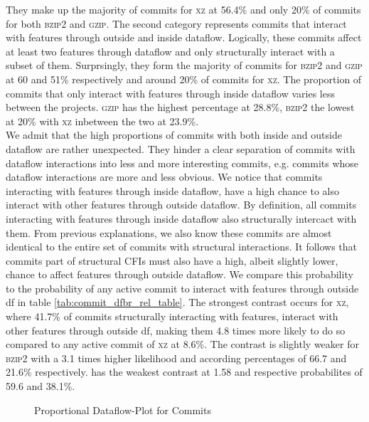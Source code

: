 They make up the majority of commits for \textsc{xz} at 56.4\% and only 20\% of commits for both \textsc{bzip2} and \textsc{gzip}.
The second category represents commits that interact with features through outside and inside dataflow.
Logically, these commits affect at least two features through dataflow and only structurally interact with a subset of them.
Surprsingly, they form the majority of commits for \textsc{bzip2} and \textsc{gzip} at 60 and 51\% respectively and around 20\% of commits for \textsc{xz}.
The proportion of commits that only interact with features through inside dataflow varies less between the projects.
\textsc{gzip} has the highest percentage at 28.8\%, \textsc{bzip2} the lowest at 20\% with \textsc{xz} inbetween the two at 23.9\%. \\
We admit that the high proportions of commits with both inside and outside dataflow are rather unexpected.
They hinder a clear separation of commits with dataflow interactions into less and more interesting commits, e.g. commits whose dataflow interactions are more and less obvious.
We notice that commits interacting with features through inside dataflow, have a high chance to also interact with other features through outside dataflow.
By definition, all commits interacting with features through inside dataflow also structurally intercact with them.
From previous explanations, we also know these commits are almost identical to the entire set of commits with structural interactions.
It follows that commits part of structural CFIs must also have a high, albeit slightly lower, chance to affect features through outside dataflow.
We compare this probability to the probability of any active commit to interact with features through outside df in table \ref{tab:commit_dfbr_rel_table}.
The strongest contrast occurs for \textsc{xz}, where 41.7\% of commits structurally interacting with features, interact with other features through outside df, making them 4.8 times more likely to do so compared to any active commit of \textsc{xz} at 8.6\%.
The contrast is slightly weaker for \textsc{bzip2} with a 3.1 times higher likelihood and according percentages of 66.7 and 21.6\% respectively. 
 has the weakest contrast at 1.58 and respective probabilites of 59.6 and 38.1\%. 

\begin{figure}[htbp]
  \centering
  
  \caption{Proportional Dataflow-Plot for Commits}
  \label{fig:commit_dfbr_plot}
\end{figure}

